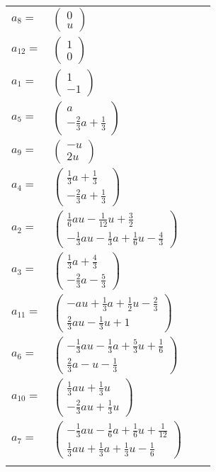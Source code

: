 \documentclass[1p]{elsarticle_modified}
\theoremstyle{definition}
\begin{document}
\begin{tabular}{m{7pt} m{180pt} m{7pt} m{180pt} }
\flushright $a_{8}=$&$\begin{pmatrix}0\\u\end{pmatrix}$ \\
\flushright $a_{12}=$&$\begin{pmatrix}1\\0\end{pmatrix}$ \\
\flushright $a_{1}=$&$\begin{pmatrix}1\\-1\end{pmatrix}$ \\
\flushright $a_{5}=$&$\begin{pmatrix}a\\-\frac{2}{3} a+\frac{1}{3}\end{pmatrix}$ \\
\flushright $a_{9}=$&$\begin{pmatrix}- u\\2 u\end{pmatrix}$ \\
\flushright $a_{4}=$&$\begin{pmatrix}\frac{1}{3} a+\frac{1}{3}\\-\frac{2}{3} a+\frac{1}{3}\end{pmatrix}$ \\
\flushright $a_{2}=$&$\begin{pmatrix}\frac{1}{6} a u-\frac{1}{12} u+\frac{3}{2}\\-\frac{1}{3} a u-\frac{1}{3} a+\frac{1}{6} u-\frac{4}{3}\end{pmatrix}$ \\
\flushright $a_{3}=$&$\begin{pmatrix}\frac{1}{3} a+\frac{4}{3}\\-\frac{2}{3} a-\frac{5}{3}\end{pmatrix}$ \\
\flushright $a_{11}=$&$\begin{pmatrix}- a u+\frac{1}{3} a+\frac{1}{2} u-\frac{2}{3}\\\frac{2}{3} a u-\frac{1}{3} u+1\end{pmatrix}$ \\
\flushright $a_{6}=$&$\begin{pmatrix}-\frac{1}{3} a u-\frac{1}{3} a+\frac{5}{3} u+\frac{1}{6}\\\frac{2}{3} a- u-\frac{1}{3}\end{pmatrix}$ \\
\flushright $a_{10}=$&$\begin{pmatrix}\frac{1}{3} a u+\frac{1}{3} u\\-\frac{2}{3} a u+\frac{1}{3} u\end{pmatrix}$ \\
\flushright $a_{7}=$&$\begin{pmatrix}-\frac{1}{3} a u-\frac{1}{6} a+\frac{1}{6} u+\frac{1}{12}\\\frac{1}{3} a u+\frac{1}{3} a+\frac{1}{3} u-\frac{1}{6}\end{pmatrix}$\\&\end{tabular}
\end{document}
